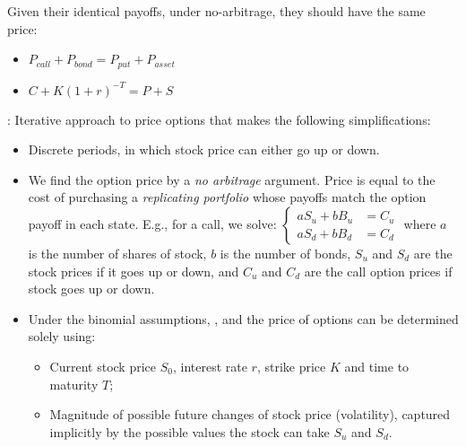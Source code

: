 \documentclass[10pt,landscape]{article}
\makeatletter
\newcommand{\Red}[1]{\noindent{\textcolor{BrickRed}{\textbf{#1}}}:}
\newcommand{\Hint}[1]{\noindent{\textcolor{Orange}{#1}}}
\newcommand*{\Eg}{E.g.\@\xspace}
\makeatother
\begin{document}
\begin{multicols}{4}
\begin{enumerate}
    \raisebox{4ex}{+}
    \raisebox{4ex}{=}
\end{enumerate}

Given their identical payoffs, under no-arbitrage, they should have the same price:
\begin{itemize}
    \item $P_{call} + P_{bond} = P_{put} + P_{asset}$
    \item $C + K(1+r)^{-T} = P + S$
\end{itemize}

\Red{Binomial option pricing model} Iterative approach to price options that makes the following simplifications:
\begin{itemize}
    \item Discrete periods, in which stock price can either go up or down.
    \item We find the option price by a \textit{no arbitrage} argument. Price is equal to the cost of purchasing a \textit{replicating portfolio} whose payoffs match the option payoff in each state. \Eg, for a call, we solve: $\begin{cases}
        a S_u + b B_u &= C_u \\
        a S_d + b B_d &= C_d
    \end{cases}$ where $a$ is the number of shares of stock, $b$ is the number of bonds, $S_u$ and $S_d$ are the stock prices if it goes up or down, and $C_u$ and $C_d$ are the call option prices if stock goes up or down.
    \item  Under the binomial assumptions, \Hint{the probability of a stock moves up or down is irrelevant}, and the price of options can be determined solely using: \begin{itemize}
        \item Current stock price $S_0$, interest rate $r$, strike price $K$ and time to maturity $T$;
        \item Magnitude of possible future changes of stock price (volatility), captured implicitly by the possible values the stock can take $S_u$ and $S_d$.
    \end{itemize}
\end{itemize}


\end{multicols}
\end{document}
